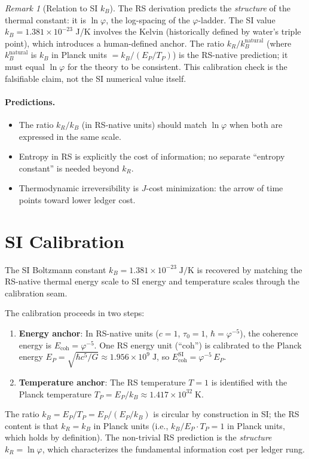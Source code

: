 \documentclass[12pt,a4paper]{article}
\theoremstyle{definition}
\theoremstyle{remark}
\newtheorem{remark}[theorem]{Remark}
\begin{document}
\begin{remark}[Relation to SI $k_B$]
The RS derivation predicts the \emph{structure} of the thermal
constant: it is $\ln\varphi$, the log-spacing of the
$\varphi$-ladder.  The SI value $k_B = 1.381 \times 10^{-23}$ J/K
involves the Kelvin (historically defined by water's triple point),
which introduces a human-defined anchor.  The ratio
$k_R / k_B^{\mathrm{natural}}$ (where $k_B^{\mathrm{natural}}$
is $k_B$ in Planck units $= k_B / (E_P/T_P)$) is the RS-native
prediction; it must equal $\ln\varphi$ for the theory to be
consistent.  This calibration check is the falsifiable
claim, not the SI numerical value itself.
\end{remark}

\paragraph{Predictions.}
\begin{itemize}
  \item The ratio $k_R/k_B$ (in RS-native units) should match
  $\ln\varphi$ when both are expressed in the same scale.
  \item Entropy in RS is explicitly the cost of information; no
  separate ``entropy constant'' is needed beyond $k_R$.
  \item Thermodynamic irreversibility is $J$-cost minimization:
  the arrow of time points toward lower ledger cost.
\end{itemize}

\section{SI Calibration}

The SI Boltzmann constant $k_B = 1.381 \times 10^{-23}\;\mathrm{J/K}$
is recovered by matching the RS-native thermal energy scale to SI
energy and temperature scales through the calibration seam.

The calibration proceeds in two steps:
\begin{enumerate}
  \item \textbf{Energy anchor}: In RS-native units ($c = 1$,
  $\tau_0 = 1$, $\hbar = \varphi^{-5}$), the coherence energy is
  $E_\mathrm{coh} = \varphi^{-5}$.
  One RS energy unit (``coh'') is calibrated to the Planck energy
  $E_P = \sqrt{\hbar c^5/G} \approx 1.956 \times 10^9\;\mathrm{J}$,
  so $E_\mathrm{coh}^{\mathrm{SI}} = \varphi^{-5}\,E_P$.
  \item \textbf{Temperature anchor}: The RS temperature $T = 1$
  is identified with the Planck temperature
  $T_P = E_P/k_B \approx 1.417 \times 10^{32}\;\mathrm{K}$.
\end{enumerate}
The ratio $k_B = E_P/T_P = E_P/(E_P/k_B)$ is circular by construction
in SI; the RS content is that $k_R = k_B$ in Planck units (i.e.,
$k_B/E_P \cdot T_P = 1$ in Planck units, which holds by definition).
The non-trivial RS prediction is the \emph{structure} $k_R = \ln\varphi$,
which characterizes the fundamental information cost per ledger rung.
\end{document}
